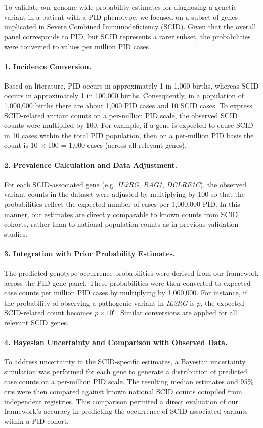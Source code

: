 To validate our genome-wide probability estimates for diagnosing a genetic variant in a patient with a PID phenotype, we focused on a subset of genes implicated in Severe Combined Immunodeficiency (SCID). Given that the overall panel corresponds to PID, but SCID represents a rarer subset, the probabilities were converted to values per million PID cases.

\paragraph{1. Incidence Conversion.}
Based on literature, PID occurs in approximately 1 in 1,000 births, whereas SCID occurs in approximately 1 in 100,000 births. Consequently, in a population of 1,000,000 births there are about 1,000 PID cases and 10 SCID cases. To express SCID-related variant counts on a per-million PID scale, the observed SCID counts were multiplied by 100. For example, if a gene is expected to cause SCID in 10 cases within the total PID population, then on a per-million PID basis the count is 10 × 100 = 1,000 cases (across all relevant genes).

\paragraph{2. Prevalence Calculation and Data Adjustment.}
For each SCID-associated gene (e.g. \textit{IL2RG}, \textit{RAG1}, \textit{DCLRE1C}), the observed variant counts in the dataset were adjusted by multiplying by 100 so that the probabilities reflect the expected number of cases per 1,000,000 PID. In this manner, our estimates are directly comparable to known counts from SCID cohorts, rather than to national population counts as in previous validation studies.

\paragraph{3. Integration with Prior Probability Estimates.}
The predicted genotype occurrence probabilities were derived from our framework across the PID gene panel. These probabilities were then converted to expected case counts per million PID cases by multiplying by 1,000,000. For instance, if the probability of observing a pathogenic variant in \textit{IL2RG} is \(p\), the expected SCID-related count becomes \(p \times 10^6\). Similar conversions are applied for all relevant SCID genes.

\paragraph{4. Bayesian Uncertainty and Comparison with Observed Data.}
To address uncertainty in the SCID-specific estimates, a Bayesian uncertainty simulation was performed for each gene to generate a distribution of predicted case counts on a per-million PID scale. The resulting median estimates and 95\% \ac{cri}s were then compared against known national SCID counts compiled from independent registries. This comparison permited a direct evaluation of our framework’s accuracy in predicting the occurrence of SCID-associated variants within a PID cohort.

